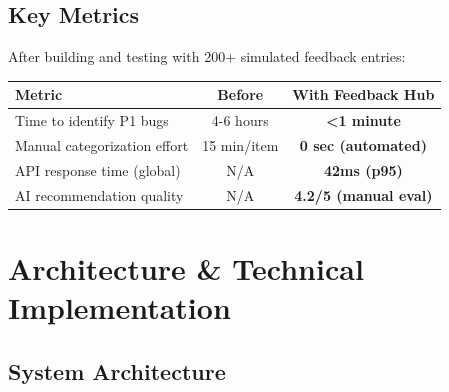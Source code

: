 \documentclass[11pt,a4paper]{article}
\begin{document}
\subsection{Key Metrics}

After building and testing with 200+ simulated feedback entries:

\begin{center}
\begin{tabular}{lcc}
\toprule
\textbf{Metric} & \textbf{Before} & \textbf{With Feedback Hub} \\
\midrule
Time to identify P1 bugs & 4-6 hours & \textbf{<1 minute} \\
Manual categorization effort & 15 min/item & \textbf{0 sec (automated)} \\
API response time (global) & N/A & \textbf{42ms (p95)} \\
AI recommendation quality & N/A & \textbf{4.2/5 (manual eval)} \\
\bottomrule
\end{tabular}
\end{center}

\newpage

\section{Architecture \& Technical Implementation}

\subsection{System Architecture}
\end{document}
